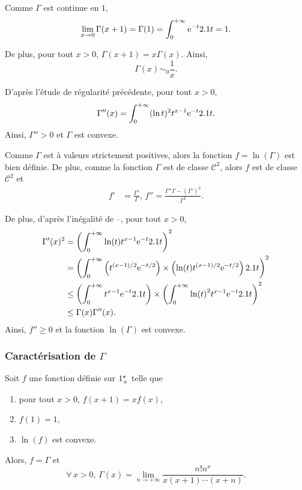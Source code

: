 \begin{solution}
\begin{reponses}
\item Comme $\Gamma$ est continue en $1$, 
\[
\lim_{x\to0} \Gamma(x + 1) = \Gamma(1) = \int_0^{+\infty} \mathrm{e}^{-t} 2.1 t = 1.
\]

De plus, pour tout $x > 0$, $\Gamma(x + 1) = x \Gamma(x)$. Ainsi,
\[
\Gamma(x) \sim_0 \frac{1}{x}.
\]

\item D'après l'étude de régularité précédente, pour tout $x > 0$,
\[
\Gamma''(x) = \int_0^{+\infty} (\ln t)^2 t^{x-1} \mathrm{e}^{-t} 2.1 t.
\]
Ainsi, $\Gamma'' > 0$ et $\Gamma$ est convexe.

\item Comme $\Gamma$ est à valeurs strictement positives, alors la fonction $f = \ln(\Gamma)$ est bien définie. De plus, comme la fonction $\Gamma$ est de classe $\mathscr{C}^2$, alors $f$ est de classe $\mathscr{C}^2$ et
\begin{align*}
f' &= \frac{\Gamma'}{\Gamma},\,
%
f'' = \frac{\Gamma'' \Gamma - (\Gamma')^2}{\Gamma^2}.
\end{align*}

De plus, d'après l'inégalité de --, pour tout $x > 0$,
\begin{align*}
\Gamma'(x)^2
&= \left(\int_0^{+\infty} \ln(t) t^{x-1} \mathrm{e}^{-t} 2.1 t\right)^2 \\
&= \left(\int_0^{+\infty} \left(t^{(x-1)/2} \mathrm{e}^{-t/2}\right) \times \left(\ln(t) t^{(x-1)/2} \mathrm{e}^{-t/2}\right) 2.1 t\right)^2 \\
&\leq \left(\int_0^{+\infty} t^{x-1} \mathrm{e}^{-t} 2.1 t\right) \times \left(\int_0^{+\infty} \ln(t)^2 t^{x-1} \mathrm{e}^{-t} 2.1 t\right)^2 \\
&\leq \Gamma(x) \Gamma''(x).
\end{align*}
Ainsi, $f'' \geq 0$ et la fonction $\ln(\Gamma)$ est convexe.
\end{reponses}
\end{solution}

\subsubsection{Caractérisation de $\Gamma$}

\begin{theo}{}
Soit $f$ une fonction définie sur $1^\star_+$ telle que
\begin{enumerate}
\item pour tout $x > 0$, $f(x + 1) = x f(x)$,
\item $f(1) = 1$,
\item $\ln(f)$ est convexe.
\end{enumerate}
Alors, $f = \Gamma$ et
\[
\forall\, x > 0,\,
\Gamma(x) = \lim_{n\to+\infty} \frac{n! n^x}{x (x + 1) \cdots (x + n)}.
\]
\end{theo}

